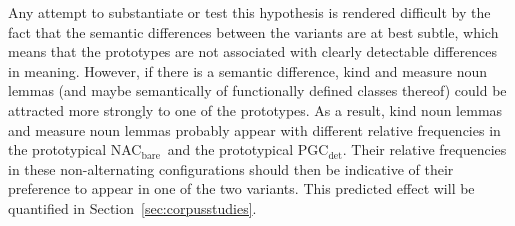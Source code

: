 \documentclass[USenglish]{article}
\newcommand{\Sub}[1]{\ensuremath{\mathrm{_{#1}}}}
\newcommand{\NACb}{NAC\Sub{bare}}
\newcommand{\PGCd}{PGC\Sub{det}}
\begin{document}
Any attempt to substantiate or test this hypothesis is rendered difficult by the fact that the semantic differences between the variants are at best subtle, which means that the prototypes are not associated with clearly detectable differences in meaning.
However, if there is a semantic difference, kind and measure noun lemmas (and maybe semantically of functionally defined classes thereof) could be attracted more strongly to one of the prototypes.
As a result, kind noun lemmas and measure noun lemmas probably appear with different relative frequencies in the prototypical \NACb\ and the prototypical \PGCd.
Their relative frequencies in these non-alternating configurations should then be indicative of their preference to appear in one of the two variants.
This predicted effect will be quantified in Section~\ref{sec:corpusstudies}.
\end{document}
